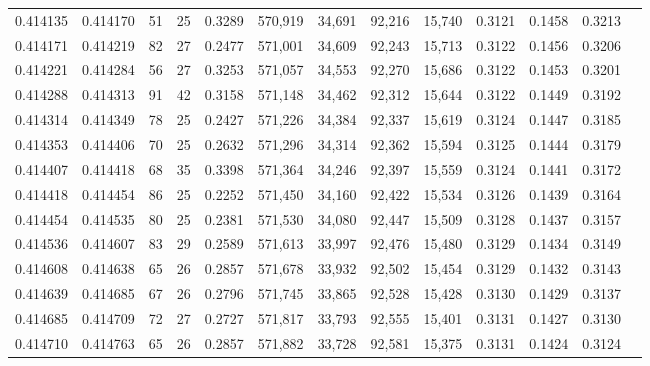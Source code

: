 \begin{tabular}{rrrrrrrrrrrrr}
0.414135 & 0.414170 &    51 &  25 &                                     0.3289 & 570,919 &  34,691 &  92,216 &  15,740 & 0.3121 & 0.1458 & 0.3213 \\
0.414171 & 0.414219 &    82 &  27 &                                     0.2477 & 571,001 &  34,609 &  92,243 &  15,713 & 0.3122 & 0.1456 & 0.3206 \\
0.414221 & 0.414284 &    56 &  27 &                                     0.3253 & 571,057 &  34,553 &  92,270 &  15,686 & 0.3122 & 0.1453 & 0.3201 \\
0.414288 & 0.414313 &    91 &  42 &                                     0.3158 & 571,148 &  34,462 &  92,312 &  15,644 & 0.3122 & 0.1449 & 0.3192 \\
0.414314 & 0.414349 &    78 &  25 &                                     0.2427 & 571,226 &  34,384 &  92,337 &  15,619 & 0.3124 & 0.1447 & 0.3185 \\
0.414353 & 0.414406 &    70 &  25 &                                     0.2632 & 571,296 &  34,314 &  92,362 &  15,594 & 0.3125 & 0.1444 & 0.3179 \\
0.414407 & 0.414418 &    68 &  35 &                                     0.3398 & 571,364 &  34,246 &  92,397 &  15,559 & 0.3124 & 0.1441 & 0.3172 \\
0.414418 & 0.414454 &    86 &  25 &                                     0.2252 & 571,450 &  34,160 &  92,422 &  15,534 & 0.3126 & 0.1439 & 0.3164 \\
0.414454 & 0.414535 &    80 &  25 &                                     0.2381 & 571,530 &  34,080 &  92,447 &  15,509 & 0.3128 & 0.1437 & 0.3157 \\
0.414536 & 0.414607 &    83 &  29 &                                     0.2589 & 571,613 &  33,997 &  92,476 &  15,480 & 0.3129 & 0.1434 & 0.3149 \\
0.414608 & 0.414638 &    65 &  26 &                                     0.2857 & 571,678 &  33,932 &  92,502 &  15,454 & 0.3129 & 0.1432 & 0.3143 \\
0.414639 & 0.414685 &    67 &  26 &                                     0.2796 & 571,745 &  33,865 &  92,528 &  15,428 & 0.3130 & 0.1429 & 0.3137 \\
0.414685 & 0.414709 &    72 &  27 &                                     0.2727 & 571,817 &  33,793 &  92,555 &  15,401 & 0.3131 & 0.1427 & 0.3130 \\
0.414710 & 0.414763 &    65 &  26 &                                     0.2857 & 571,882 &  33,728 &  92,581 &  15,375 & 0.3131 & 0.1424 & 0.3124 \\

\end{tabular}
